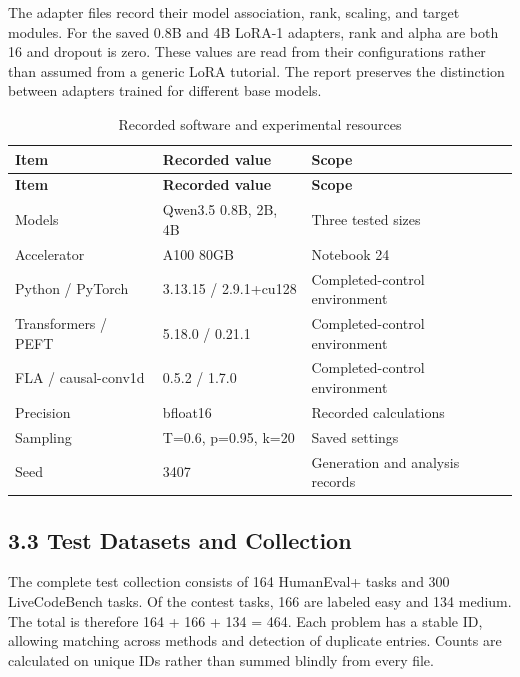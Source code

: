 \documentclass[11pt,letterpaper]{article}
\begin{document}
The adapter files record their model association, rank, scaling, and target modules. For the saved 0.8B and 4B LoRA-1 adapters, rank and alpha are both 16 and dropout is zero. These values are read from their configurations rather than assumed from a generic LoRA tutorial. The report preserves the distinction between adapters trained for different base models.\par

\begingroup\singlespacing\small\setlength{\tabcolsep}{4pt}
\begin{longtable}{|p{1.997in}|p{1.997in}|p{1.997in}|}
\caption{Recorded software and experimental resources}\label{tab:software}\\
\hline
\textbf{Item} & \textbf{Recorded value} & \textbf{Scope}\\\hline
\endfirsthead
\hline
\textbf{Item} & \textbf{Recorded value} & \textbf{Scope}\\\hline
\endhead
Models & Qwen3.5 0.8B, 2B, 4B & Three tested sizes\\\hline
Accelerator & A100 80GB & Notebook 24\\\hline
Python / PyTorch & 3.13.15 / 2.9.1+cu128 & Completed-control environment\\\hline
Transformers / PEFT & 5.18.0 / 0.21.1 & Completed-control environment\\\hline
FLA / causal-conv1d & 0.5.2 / 1.7.0 & Completed-control environment\\\hline
Precision & bfloat16 & Recorded calculations\\\hline
Sampling & T=0.6, p=0.95, k=20 & Saved settings\\\hline
Seed & 3407 & Generation and analysis records\\\hline
\end{longtable}
\endgroup

\subsection*{3.3 Test Datasets and Collection}

The complete test collection consists of 164 HumanEval+ tasks and 300 LiveCodeBench tasks. Of the contest tasks, 166 are labeled easy and 134 medium. The total is therefore 164 + 166 + 134 = 464. Each problem has a stable ID, allowing matching across methods and detection of duplicate entries. Counts are calculated on unique IDs rather than summed blindly from every file.\par
\end{document}
